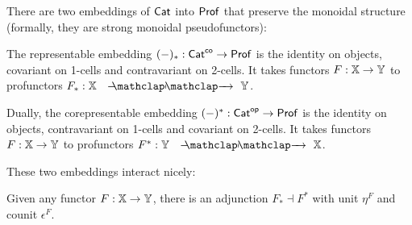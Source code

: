 There are two embeddings of ${\sf Cat}$ into ${\sf Prof}$ that preserve the monoidal structure (formally, they are strong monoidal pseudofunctors):

\begin{definition}
The representable embedding $(-)_*:{\sf Cat}^{\mathsf{co}} \to {\sf Prof}$ is the identity on objects,  covariant on 1-cells and contravariant on 2-cells.  It takes functors $F:\mathbb{X}\to \mathbb{Y}$ to profunctors  $F_*:\X\proarrow \Y$.


Dually, the corepresentable embedding $(-)^*:{\sf Cat}^{\mathsf{op}} \to {\sf Prof}$  is the identity on objects, contravariant on 1-cells and covariant on 2-cells. It takes functors $F:\mathbb{X}\to \mathbb{Y}$ to profunctors  $F^*:\Y\proarrow \X$.

\end{definition}

These two embeddings interact nicely:

\begin{lemma}
Given any functor $F:\mathbb{X}\to \mathbb{Y}$, there is an adjunction $F_* \dashv F^*$ with unit $\eta^F$ and counit $\epsilon^F$.
\end{lemma}

